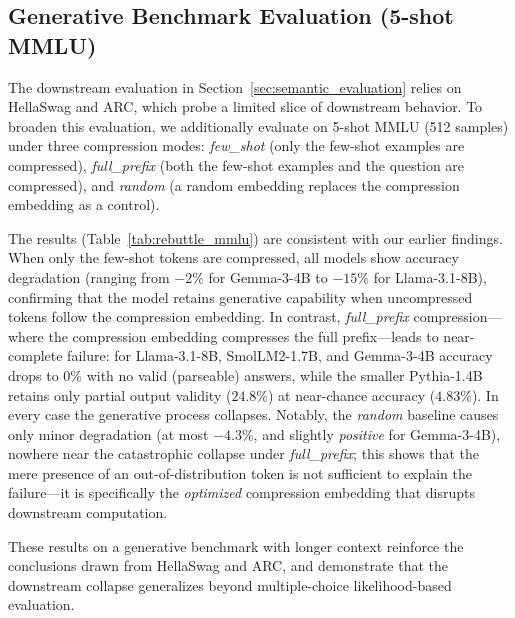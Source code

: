 \subsection{Generative Benchmark Evaluation (5-shot MMLU)}
\label{app:mmlu}

The downstream evaluation in Section~\ref{sec:semantic_evaluation} relies on HellaSwag and ARC, which probe a limited slice of downstream behavior. To broaden this evaluation, we additionally evaluate on 5-shot MMLU (512 samples) under three compression modes: \textit{few\_shot} (only the few-shot examples are compressed), \textit{full\_prefix} (both the few-shot examples and the question are compressed), and \textit{random} (a random embedding replaces the compression embedding as a control).

The results (Table~\ref{tab:rebuttle_mmlu}) are consistent with our earlier findings. When only the few-shot tokens are compressed, all models show accuracy degradation (ranging from $-2\%$ for Gemma-3-4B to $-15\%$ for Llama-3.1-8B), confirming that the model retains generative capability when uncompressed tokens follow the compression embedding. In contrast, \textit{full\_prefix} compression---where the compression embedding compresses the full prefix---leads to near-complete failure: for Llama-3.1-8B, SmolLM2-1.7B, and Gemma-3-4B accuracy drops to $0\%$ with no valid (parseable) answers, while the smaller Pythia-1.4B retains only partial output validity ($24.8\%$) at near-chance accuracy ($4.83\%$). In every case the generative process collapses. Notably, the \textit{random} baseline causes only minor degradation (at most $-4.3\%$, and slightly \emph{positive} for Gemma-3-4B), nowhere near the catastrophic collapse under \textit{full\_prefix}; this shows that the mere presence of an out-of-distribution token is not sufficient to explain the failure---it is specifically the \emph{optimized} compression embedding that disrupts downstream computation.

These results on a generative benchmark with longer context reinforce the conclusions drawn from HellaSwag and ARC, and demonstrate that the downstream collapse generalizes beyond multiple-choice likelihood-based evaluation.

\begin{table}[tb]
\centering
\caption{5-shot MMLU accuracy on 512 samples with a compression embedding in context. \textbf{CompMode = few\_shot}: only the few-shot tokens were compressed with cramming. \textbf{CompMode = full\_prefix}: few-shot tokens and question tokens were compressed. \textbf{CompMode = random}: a random embedding was placed instead of the compression embedding. \textbf{Baseline Acc}: accuracy of the base model without a compression embedding. \textbf{Compressed Acc}: accuracy with a compression embedding in context (regular tokens placed after the compression embedding). \textbf{Valid} columns report the percentage of valid generated answers (answers parsed successfully).}
\label{tab:rebuttle_mmlu}
\begin{small}

\end{small}
\end{table}

